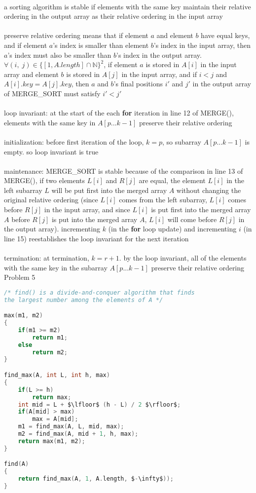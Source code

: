 \documentclass[12pt,border=4pt,multi]{article}%
\begin{document}
\\
a sorting algorithm is stable if elements with the same key maintain their relative ordering in the output array as their relative ordering in the input array\\
\\
preserve relative ordering means that if element $a$ and element $b$ have equal keys, and if element $a$'s index is smaller than element $b$'s index in the input array, then $a$'s index must also be smaller than $b$'s index in the output array. $\forall (i,\; j) \in \{[1, A.length] \cap \mathbb{N}\}^2$, if element $a$ is stored in $A[i]$ in the input array and element $b$ is stored in $A[j]$ in the input array, and if $i < j$ and $A[i].key = A[j].key$, then $a$ and $b$'s final positions $i'$ and $j'$ in the output array of MERGE\_SORT must satisfy $i' < j'$\\
\\
loop invariant: at the start of the each \textbf{for} iteration in line 12 of MERGE(), elements with the same key in $A[p...k - 1]$ preserve their relative ordering\\
\\
initialization: before first iteration of the loop, $k = p$, so subarray $A[p...k - 1]$ is empty. so loop invariant is true\\
\\
maintenance: MERGE\_SORT is stable because of the comparison in line 13 of MERGE(), if two elements $L[i]$ and $R[j]$ are equal, the element $L[i]$ in the left subarray $L$ will be put first into the merged array $A$ without changing the original relative ordering (since $L[i]$ comes from the left subarray, $L[i]$ comes before $R[j]$ in the input array, and since $L[i]$ is put first into the merged array $A$ before $R[j]$ is put into the merged array $A$, $L[i]$ will come before $R[j]$ in the output array). incrementing $k$ (in the \textbf{for} loop update) and incrementing $i$ (in line 15) reestablishes the loop invariant for the next iteration\\
\\
termination: at termination, $k = r + 1$. by the loop invariant, all of the elements with the same key in the subarray $A[p...k - 1]$ preserve their relative ordering\\
\newpage 
\noindent
Problem 5
\begin{lstlisting}[mathescape = true, language = c]
/* find() is a divide-and-conquer algorithm that finds
the largest number among the elements of A */

max(m1, m2)
{
    if(m1 >= m2)
        return m1;
    else
        return m2;
}

find_max(A, int L, int h, max)
{
    if(L >= h)
        return max;
    int mid = L + $\lfloor$ (h - L) / 2 $\rfloor$;
    if(A[mid] > max)
        max = A[mid];
    m1 = find_max(A, L, mid, max);
    m2 = find_max(A, mid + 1, h, max);
    return max(m1, m2);
}

find(A)
{
    return find_max(A, 1, A.length, $-\infty$));
}
\end{lstlisting}
\end{document}
